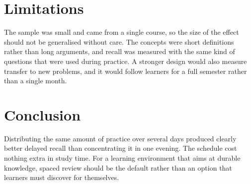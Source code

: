 \documentclass[11pt,twocolumn]{article}
\begin{document}
\section*{Limitations}
The sample was small and came from a single course, so the size of the effect should not be generalised without care. The concepts were short definitions rather than long arguments, and recall was measured with the same kind of questions that were used during practice. A stronger design would also measure transfer to new problems, and it would follow learners for a full semester rather than a single month.

\section*{Conclusion}
Distributing the same amount of practice over several days produced clearly better delayed recall than concentrating it in one evening. The schedule cost nothing extra in study time. For a learning environment that aims at durable knowledge, spaced review should be the default rather than an option that learners must discover for themselves.
\end{document}
